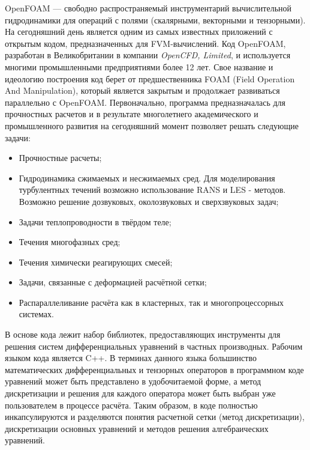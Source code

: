 \documentclass[pdftex,a4paper,12pt]{article}
\begin{document}
	\hspace{2em}OpenFOAM — свободно распространяемый инструментарий вычислительной гидродинамики для операций с полями (скалярными, векторными и тензорными). На сегодняшний день является одним из самых известных приложений с открытым кодом, предназначенных для FVM-вычислений.
	Код OpenFOAM, разработан в Великобритании в компании \textit{OpenCFD, Limited}, и используется многими промышленными предприятиями более 12 лет. Свое название и идеологию построения код берет от предшественника FOAM (Field Operation And Manipulation), который является закрытым и продолжает развиваться параллельно с OpenFOAM. Первоначально, программа предназначалась для прочностных расчетов и в результате многолетнего академического и промышленного развития на сегодняшний момент позволяет решать следующие задачи:
\begin{itemize}
	\item Прочностные расчеты;
	\item Гидродинамика сжимаемых и несжимаемых сред. Для моделирования турбулентных течений возможно использование RANS и LES - методов. Возможно решение дозвуковых, околозвуковых и сверхзвуковых задач;
  \item Задачи теплопроводности в твёрдом теле;
  \item Течения многофазных сред;
  \item Течения химически реагирующих смесей;
  \item Задачи, связанные с деформацией расчётной сетки;
  \item Распараллеливание расчёта как в кластерных, так и многопроцессорных системах.
\end{itemize}

В основе кода лежит набор библиотек, предоставляющих инструменты для решения систем дифференциальных уравнений в частных производных. Рабочим языком кода является C++. В терминах данного языка большинство математических дифференциальных и тензорных операторов в программном коде уравнений может быть представлено в удобочитаемой форме, а метод дискретизации и решения для каждого оператора может быть выбран уже пользователем в процессе расчёта. Таким образом, в коде полностью инкапсулируются и разделяются понятия расчетной сетки (метод дискретизации), дискретизации основных уравнений и методов решения алгебраических уравнений.
\end{document}
